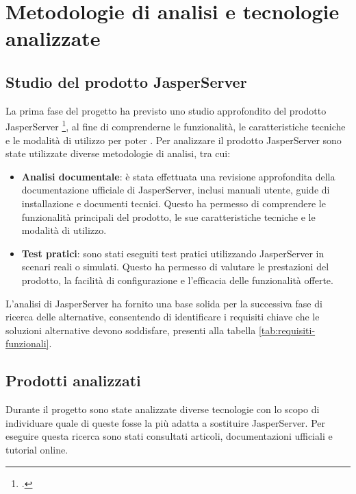 \chapter{Metodologie di analisi e tecnologie analizzate}
\label{cap:processi-metodologie}


\section{Studio del prodotto JasperServer}
\label{sec:studio-jasperserver}
    La prima fase del progetto ha previsto uno studio approfondito del prodotto JasperServer \footcite{site:jasperreports}, al fine di comprenderne le funzionalità, le caratteristiche tecniche e le modalità di utilizzo per poter .
    Per analizzare il prodotto JasperServer sono state utilizzate diverse metodologie di analisi, tra cui:
    \begin{itemize}
        \item \textbf{Analisi documentale}: è stata effettuata una revisione approfondita della documentazione ufficiale di JasperServer, inclusi manuali utente, guide di installazione e documenti tecnici. Questo ha permesso di comprendere le funzionalità principali del prodotto, le sue caratteristiche tecniche e le modalità di utilizzo.
        
        \item \textbf{Test pratici}: sono stati eseguiti test pratici utilizzando JasperServer in scenari reali o simulati. Questo ha permesso di valutare le prestazioni del prodotto, la facilità di configurazione e l'efficacia delle funzionalità offerte.
    \end{itemize}
    L'analisi di JasperServer ha fornito una base solida per la successiva fase di ricerca delle alternative, consentendo di identificare i requisiti chiave che le soluzioni alternative devono soddisfare, presenti alla tabella \ref{tab:requisiti-funzionali}.
\section{Prodotti analizzati}
\label{sec:prodotti-analizzati}
    Durante il progetto sono state analizzate diverse tecnologie con lo scopo di individuare quale di queste fosse la più adatta a sostituire JasperServer.
    Per eseguire questa ricerca sono stati consultati articoli, documentazioni ufficiali e tutorial online.
